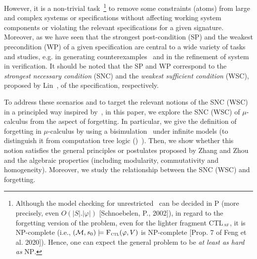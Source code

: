\documentclass[runningheads]{llncs}
\begin{document}
However, it is a non-trivial task~\footnote{Although the model checking for unrestricted \CTL\ can be decided in P (more precisely, even  $O(|S|.|\varphi|)$ [Schnoebelen, P., 2002]), in regard to the forgetting version of the problem, even for the lighter fragment CTL$_{\textsc{a}\textsc{f}}$, it is NP-complete  (i.e., $({\cal M},s_0) \models {\textsc{F}_{\textsc{ctl}}}(\varphi, V)$ is \textsc{NP}-complete [Prop. 7 of  Feng et al. 2020]). Hence, one can expect the general problem to be \emph{at least as hard as} \textsc{NP}.
} to remove some constraints (atoms) from large and complex systems or specifications without affecting working system components or violating the relevant specifications for a given signature.
Moreover, as we have seen that
the strongest post-condition (SP) and the weakest precondition (WP) of a given specification are central to a wide variety of tasks and studies, e.g. in generating counterexamples~\cite{dailler2018instrumenting} and in the refinement of system~\cite{woodcock1990refinement} in verification.
It should be noted that the SP and WP correspond to the \emph{strongest necessary condition} (SNC) and the \emph{weakest sufficient condition}  (WSC), proposed by Lin~\cite{DBLP:Lin:AIJ:2001}, of the specification, respectively.


To address these scenarios and to target the relevant notions of the SNC (WSC) in a principled way
inspired by~\cite{DBLP:Lin:AIJ:2001,renyansfirstpaper}, in this paper, we explore the SNC (WSC) of $\mu$-calculus from the aspect of forgetting.
In particular, we give the definition of forgetting in $\mu$-calculus by using a bisimulation~\cite{browne1988characterizing,Baier:PMC:2008,Yan:AIJ:2009} under infinite models (to distinguish it from computation tree logic (\CTL)~\cite{renyansfirstpaper}). Then, we show whether this notion satisfies the general principles or postulates proposed by Zhang and Zhou~\cite{Yan:AIJ:2009} and the algebraic properties (including modularity, commutativity and homogeneity).
Moreover, we study the relationship between the SNC (WSC) and forgetting.
\end{document}
